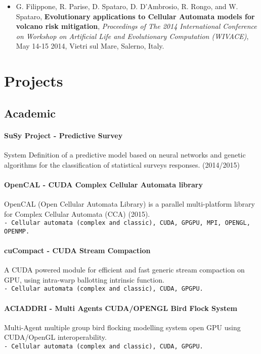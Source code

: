 \documentclass[a4paper,10pt]{article}
\begin{document}
\begin{itemize}
    \item G. Filippone, R. Parise, D. Spataro,
	D. D'Ambrosio, R. Rongo, and W. Spataro, \textbf{Evolutionary
	applications to Cellular Automata models for volcano risk mitigation},
	\emph{Proceedings of The 2014 International Conference on Workshop on Artificial Life and
	Evolutionary Computation (WIVACE)}, May 14-15 2014, Vietri sul Mare, Salerno,
	Italy.
   

\end{itemize}

\begin{center}
\mbox{}
\end{center}

\section{Projects}

\subsection{Academic}
 \paragraph{SuSy Project - Predictive Survey}
 System Definition of a predictive
 model based on neural networks and genetic algorithms for the classification of
 statistical surveys responses. (2014/2015)

\paragraph{OpenCAL - CUDA Complex Cellular Automata library} 
OpenCAL (Open Cellular Automata Library) is a parallel multi-platform library
for Complex Cellular Automata (CCA) (2015).
\hfill \\
\texttt{- \noindent Cellular automata (complex and classic), CUDA, GPGPU, MPI, OPENGL,
OPENMP.}
 
 \paragraph{cuCompact - CUDA Stream Compaction} 
A CUDA powered module for efficient and fast generic stream compaction on GPU,
using intra-warp ballotting intrinsic function. 
\hfill \\
\texttt{- 
\noindent Cellular automata (complex and classic), CUDA, GPGPU.}

 \paragraph{ACIADDRI - Multi Agents CUDA/OPENGL Bird Flock System} 
Multi-Agent multiple group bird flocking modelling system open GPU using
CUDA/OpenGL interoperability.
\hfill \\
\texttt{- 
\noindent Cellular automata (complex and classic), CUDA, GPGPU.}
\end{document}
